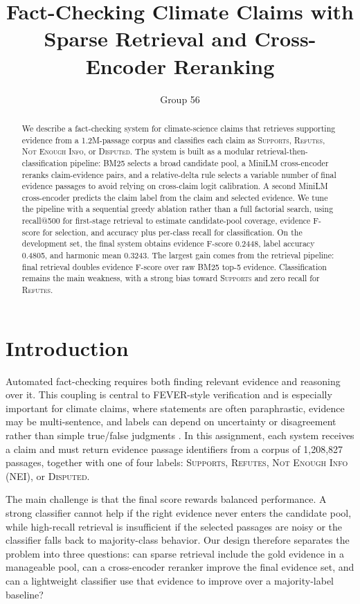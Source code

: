 \documentclass[11pt]{article}
\title{Fact-Checking Climate Claims with Sparse Retrieval and Cross-Encoder Reranking}
\author{Group 56}
\begin{document}
\maketitle

\begin{abstract}
We describe a fact-checking system for climate-science claims that retrieves supporting evidence from a 1.2M-passage corpus and classifies each claim as \textsc{Supports}, \textsc{Refutes}, \textsc{Not Enough Info}, or \textsc{Disputed}. The system is built as a modular retrieval-then-classification pipeline: BM25 selects a broad candidate pool, a MiniLM cross-encoder reranks claim-evidence pairs, and a relative-delta rule selects a variable number of final evidence passages to avoid relying on cross-claim logit calibration. A second MiniLM cross-encoder predicts the claim label from the claim and selected evidence. We tune the pipeline with a sequential greedy ablation rather than a full factorial search, using recall@500 for first-stage retrieval to estimate candidate-pool coverage, evidence F-score for selection, and accuracy plus per-class recall for classification. On the development set, the final system obtains evidence F-score 0.2448, label accuracy 0.4805, and harmonic mean 0.3243. The largest gain comes from the retrieval pipeline: final retrieval doubles evidence F-score over raw BM25 top-5 evidence. Classification remains the main weakness, with a strong bias toward \textsc{Supports} and zero recall for \textsc{Refutes}.
\end{abstract}

\section{Introduction}

Automated fact-checking requires both finding relevant evidence and reasoning over it. This coupling is central to FEVER-style verification \citep{thorne2018fever} and is especially important for climate claims, where statements are often paraphrastic, evidence may be multi-sentence, and labels can depend on uncertainty or disagreement rather than simple true/false judgments \citep{diggelmann2020climatefever}. In this assignment, each system receives a claim and must return evidence passage identifiers from a corpus of 1,208,827 passages, together with one of four labels: \textsc{Supports}, \textsc{Refutes}, \textsc{Not Enough Info} (NEI), or \textsc{Disputed}.

The main challenge is that the final score rewards balanced performance. A strong classifier cannot help if the right evidence never enters the candidate pool, while high-recall retrieval is insufficient if the selected passages are noisy or the classifier falls back to majority-class behavior. Our design therefore separates the problem into three questions: can sparse retrieval include the gold evidence in a manageable pool, can a cross-encoder reranker improve the final evidence set, and can a lightweight classifier use that evidence to improve over a majority-label baseline?
\end{document}
